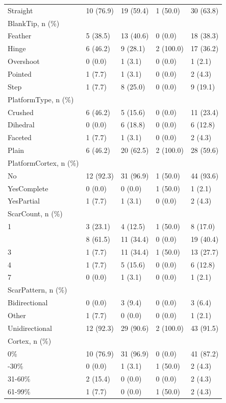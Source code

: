 \documentclass[12pt,twoside]{reedthesis}
\begin{document}
\begin{longtable}[t]{lllll}
Straight & 10 (76.9) & 19 (59.4) & 1 (50.0) & 30 (63.8)\\
BlankTip, n (\%) &  &  &  & \\
Feather & 5 (38.5) & 13 (40.6) & 0 (0.0) & 18 (38.3)\\
\addlinespace
Hinge & 6 (46.2) & 9 (28.1) & 2 (100.0) & 17 (36.2)\\
Overshoot & 0 (0.0) & 1 (3.1) & 0 (0.0) & 1 (2.1)\\
Pointed & 1 (7.7) & 1 (3.1) & 0 (0.0) & 2 (4.3)\\
Step & 1 (7.7) & 8 (25.0) & 0 (0.0) & 9 (19.1)\\
PlatformType, n (\%) &  &  &  & \\
\addlinespace
Crushed & 6 (46.2) & 5 (15.6) & 0 (0.0) & 11 (23.4)\\
Dihedral & 0 (0.0) & 6 (18.8) & 0 (0.0) & 6 (12.8)\\
Faceted & 1 (7.7) & 1 (3.1) & 0 (0.0) & 2 (4.3)\\
Plain & 6 (46.2) & 20 (62.5) & 2 (100.0) & 28 (59.6)\\
PlatformCortex, n (\%) &  &  &  & \\
\addlinespace
No & 12 (92.3) & 31 (96.9) & 1 (50.0) & 44 (93.6)\\
YesComplete & 0 (0.0) & 0 (0.0) & 1 (50.0) & 1 (2.1)\\
YesPartial & 1 (7.7) & 1 (3.1) & 0 (0.0) & 2 (4.3)\\
ScarCount, n (\%) &  &  &  & \\
1 & 3 (23.1) & 4 (12.5) & 1 (50.0) & 8 (17.0)\\
\addlinespace
2 & 8 (61.5) & 11 (34.4) & 0 (0.0) & 19 (40.4)\\
3 & 1 (7.7) & 11 (34.4) & 1 (50.0) & 13 (27.7)\\
4 & 1 (7.7) & 5 (15.6) & 0 (0.0) & 6 (12.8)\\
7 & 0 (0.0) & 1 (3.1) & 0 (0.0) & 1 (2.1)\\
ScarPattern, n (\%) &  &  &  & \\
\addlinespace
Bidirectional & 0 (0.0) & 3 (9.4) & 0 (0.0) & 3 (6.4)\\
Other & 1 (7.7) & 0 (0.0) & 0 (0.0) & 1 (2.1)\\
Unidirectional & 12 (92.3) & 29 (90.6) & 2 (100.0) & 43 (91.5)\\
Cortex, n (\%) &  &  &  & \\
0\% & 10 (76.9) & 31 (96.9) & 0 (0.0) & 41 (87.2)\\
\addlinespace
1-30\% & 0 (0.0) & 1 (3.1) & 1 (50.0) & 2 (4.3)\\
31-60\% & 2 (15.4) & 0 (0.0) & 0 (0.0) & 2 (4.3)\\
61-99\% & 1 (7.7) & 0 (0.0) & 1 (50.0) & 2 (4.3)\\*
\end{longtable}
\endgroup{}
\end{document}
